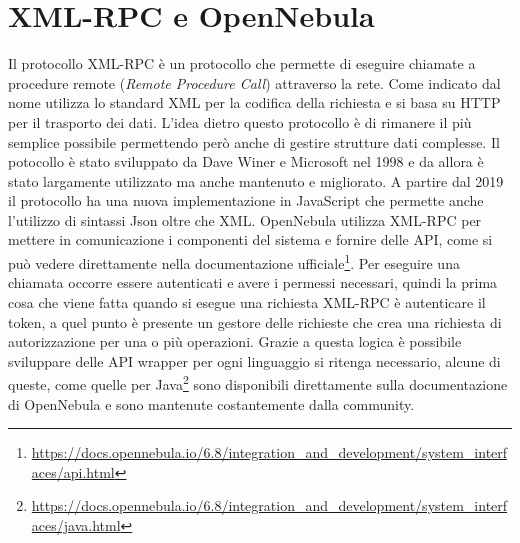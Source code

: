 \section{XML-RPC e OpenNebula}
Il protocollo XML-RPC\cite{xmlrpc} è un protocollo che permette di eseguire chiamate a procedure remote (\emph{Remote Procedure Call}) attraverso la rete. Come indicato dal nome utilizza lo standard XML per la codifica della richiesta e si basa su HTTP per il trasporto dei dati.\medbreak
L'idea dietro questo protocollo è di rimanere il più semplice possibile permettendo però anche di gestire strutture dati complesse. Il potocollo è stato sviluppato da Dave Winer e Microsoft nel 1998 e da allora è stato largamente utilizzato ma anche mantenuto e migliorato.
A partire dal 2019 il protocollo ha una nuova implementazione in JavaScript che permette anche l'utilizzo di sintassi Json oltre che XML.\medbreak
OpenNebula utilizza XML-RPC per mettere in comunicazione i componenti del sistema e fornire delle API, come si può vedere direttamente nella documentazione ufficiale\footnote{\url{https://docs.opennebula.io/6.8/integration\_and\_development/system\_interfaces/api.html}}. Per eseguire una chiamata occorre essere autenticati e avere i permessi necessari, quindi la prima cosa che viene fatta quando si esegue una richiesta XML-RPC è autenticare il token, a quel punto è presente un gestore delle richieste che crea una richiesta di autorizzazione per una o più operazioni. Grazie a questa logica è possibile sviluppare delle API wrapper per ogni linguaggio si ritenga necessario, alcune di queste, come quelle per Java\footnote{\url{https://docs.opennebula.io/6.8/integration\_and\_development/system\_interfaces/java.html}} sono disponibili direttamente sulla documentazione di OpenNebula e sono mantenute costantemente dalla community.